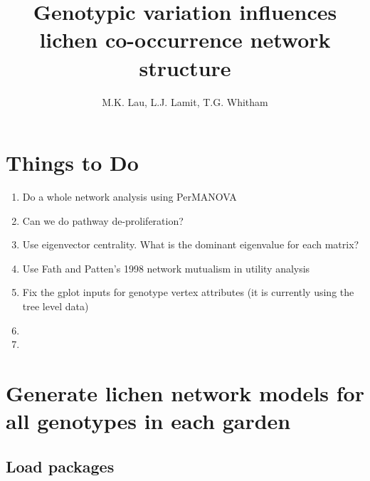 \documentclass[11pt]{amsart}
\title{Genotypic variation influences lichen co-occurrence network structure}
\author{M.K. Lau, L.J. Lamit, T.G. Whitham}
\begin{document}
\maketitle

\section{Things to Do}
\begin{enumerate}
\item Do a whole network analysis using PerMANOVA
\item Can we do pathway de-proliferation?
\item Use eigenvector centrality. What is the dominant eigenvalue for each matrix?
\item Use Fath and Patten's 1998 network mutualism in utility analysis
\item Fix the gplot inputs for genotype vertex attributes (it is
  currently using the tree level data)
\item
\item
\end{enumerate}

\section{Generate lichen network models for all genotypes in each garden}

\subsection{Load packages}
\end{document}

